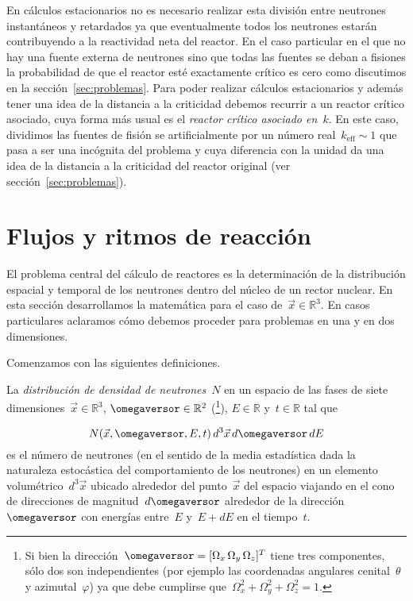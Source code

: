 En cálculos estacionarios no es necesario realizar esta división entre neutrones instantáneos y retardados ya que eventualmente todos los neutrones estarán contribuyendo a la reactividad neta del reactor. En el caso particular en el que no hay una fuente externa de neutrones sino que todas las fuentes se deban a fisiones la probabilidad de que el reactor esté exactamente crítico es cero como discutimos en la sección~\ref{sec:problemas}. Para poder realizar cálculos estacionarios y además tener una idea de la distancia a la criticidad debemos recurrir a un reactor crítico asociado, cuya forma más usual es el \emph{reactor crítico asociado en~$k$}. En este caso, dividimos las fuentes de fisión se artificialmente por un número real~$k_\text{eff} \sim 1$ que pasa a ser una incógnita del problema y cuya diferencia con la unidad da una idea de la distancia a la criticidad del reactor original (ver sección~\ref{sec:problemas}).




\section{Flujos y ritmos de reacción} %

El problema central del cálculo de reactores es la determinación de la distribución espacial y temporal de los neutrones dentro del núcleo de un rector nuclear. En esta sección desarrollamos la matemática para el caso de~$\vec{x} \in \mathbb{R}^3$. En casos particulares aclaramos cómo debemos proceder para problemas en una y en dos dimensiones.

{\color{red} \lipsum[18]}

Comenzamos con las siguientes definiciones.

\begin{definicion}
\label{def:N}
La \emph{distribución de densidad de neutrones}~$N$ en un espacio de las fases de siete dimensiones~$\vec{x} \in \mathbb{R}^3$, $\omegaversor \in \mathbb{R}^2$ (\footnote{Si bien la dirección~$\omegaversor = [ \Omega_x \, \Omega_y \, \Omega_z]^T$ tiene tres componentes, sólo dos son independientes (por ejemplo las coordenadas angulares cenital~$\theta$ y azimutal~$\varphi$) ya que debe cumplirse que~$\Omega_x^2 + \Omega_y^2 + \Omega_z^2 = 1$.}), $E \in \mathbb{R}$ y~$t \in \mathbb{R}$ tal que

\begin{equation*}
 N(\vec{x}, \omegaversor, E, t) \, d^3\vec{x} \, d\omegaversor \, dE
\end{equation*}
%
es el número de neutrones (en el sentido de la media estadística dada la naturaleza estocástica del comportamiento de los neutrones) en un elemento volumétrico~$d^3\vec{x}$ ubicado alrededor del punto~$\vec{x}$ del espacio viajando en el cono de direcciones de magnitud~$d\omegaversor$ alrededor de la dirección~$\omegaversor$ con energías entre~$E$ y~$E+dE$ en el tiempo~$t$.
\end{definicion}


